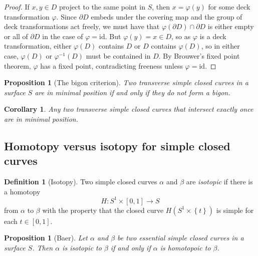 \documentclass[reqno]{amsart}
\newtheorem{proposition}[theorem]{Proposition}
\newtheorem{corollary}[theorem]{Corollary}
\theoremstyle{definition}
\newtheorem{definition}[theorem]{Definition}
\theoremstyle{remark}
\newcommand{\id}{{\mathrm{id}}}
\begin{document}
\begin{proof}
    If $x,y \in D$ project to the same point in
    $S$, then $x = \varphi (y)$ for some
    deck transformation $\varphi $. Since
    $\partial D$ embeds under the covering map
    and the group of deck transformations act freely, we
    must have that $\varphi \left( \partial D \right) \cap
    \partial D$ is either empty or all of $\partial D$ in the
    case of $\varphi  = \id$. But $\varphi (y) = x
    \in D$, so as $\varphi $ is a deck transformation,
    either
    $\varphi (D)$ contains $D$ or $D$ contains
    $\varphi (D)$, so in either case,
    $\varphi (D)$ or $\varphi^{-1}(D)$ must be contained
    in $D$. By Brouwer's fixed point theorem,
    $\varphi $ has a fixed point, contradicting freeness unless
    $\varphi  = \id$. 

\end{proof}


\begin{proposition}[The bigon criterion]
    Two transverse simple closed curves in a surface $S$ are in
    minimal position if and only if they do not form
    a bigon.
\end{proposition}

\begin{corollary}
    Any two transverse simple closed curves that intersect exactly once are in
    minimal position.
\end{corollary}

\subsection{Homotopy versus isotopy for simple closed curves}

\begin{definition}[Isotopy]
    Two simple closed curves $\alpha$ and $\beta$ are \textit{isotopic}
    if there is a homotopy 
    \[
    H \colon S^{1} \times \left[ 0,1 \right] \to 
    S
    \] 
    from $\alpha$ to $\beta$ with the property that the closed
    curve $H \left( S^{1} \times \left\{ t \right\}  \right) $ 
    is simple for each $t \in \left[ 0,1 \right] $.
\end{definition}

\begin{proposition}[Baer]
    Let $\alpha$ and $\beta$ be two essential simple closed curves
    in a surface $S$. Then $\alpha$ is isotopic to $\beta$ if and
    only if $\alpha$ is homotopoic to $\beta$.
\end{proposition}
\end{document}
